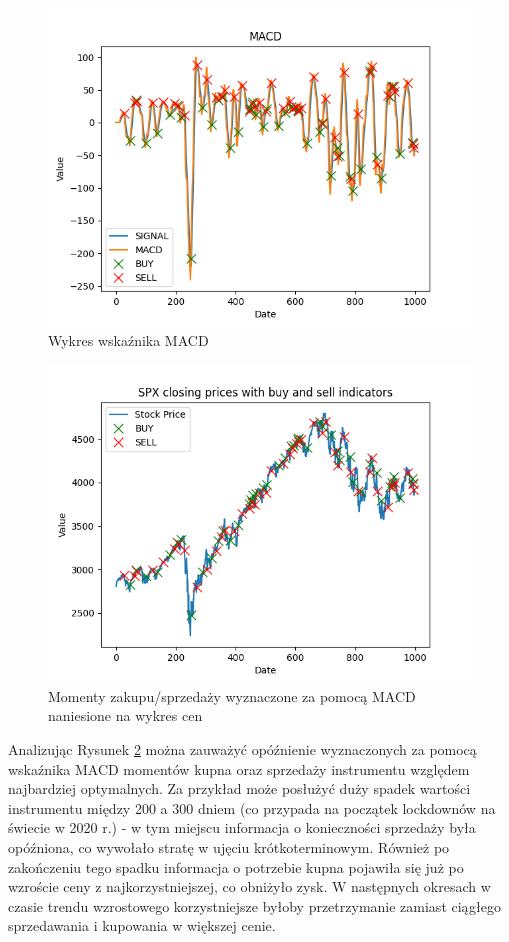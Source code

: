 \documentclass{article}
\begin{document}
\begin{figure}[h]
\centering
\includegraphics{macd.png}
\caption{\label{fig:macd}Wykres wskaźnika MACD}
\end{figure}

\begin{figure}[ht]
\centering
\includegraphics{stock_prices.png}
\caption{\label{fig:stock_prices}Momenty zakupu/sprzedaży wyznaczone za pomocą MACD naniesione na wykres cen}
\end{figure}

Analizując Rysunek \ref{fig:stock_prices} można zauważyć opóźnienie wyznaczonych za pomocą wskaźnika MACD momentów kupna oraz sprzedaży instrumentu względem najbardziej optymalnych. Za przykład może posłużyć duży spadek wartości instrumentu między 200 a 300 dniem (co przypada na początek lockdownów na świecie w 2020 r.) - w tym miejscu informacja o konieczności sprzedaży była opóźniona, co wywołało stratę w ujęciu krótkoterminowym. Również po zakończeniu tego spadku informacja o potrzebie kupna pojawiła się już po wzroście ceny z najkorzystniejszej, co obniżyło zysk. W następnych okresach w czasie trendu wzrostowego korzystniejsze byłoby przetrzymanie zamiast ciągłego sprzedawania i kupowania w większej cenie.
\end{document}
